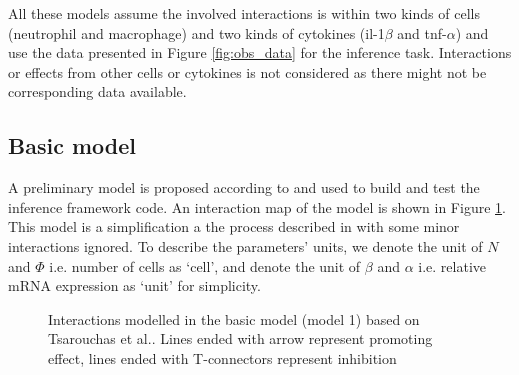 \documentclass[12pt,a4paper]{report}
\begin{document}
All these models assume the involved interactions is within two kinds of cells (neutrophil and macrophage) and two kinds of cytokines (il-1$\beta$ and tnf-$\alpha$) and use the data presented in Figure \ref{fig:obs_data} for the inference task. Interactions or effects from other cells or cytokines is not considered as there might not be corresponding data available.

\subsection{Basic model}

A preliminary model is proposed according to \cite{ref:Tsarouchas} and used to build and test the inference framework code. An interaction map of the model is shown in Figure \ref{fig:m1}. This model is a simplification a the process described in \cite{ref:Tsarouchas} with some minor interactions ignored. To describe the parameters' units, we denote the unit of $N$ and $\Phi$ i.e. number of cells as `cell', and denote the unit of $\beta$ and $\alpha$ i.e. relative mRNA expression as `unit' for simplicity.

\begin{figure}
    \begin{center}
    \end{center}
    
    \caption[Interactions modelled in the basic model]%
    {Interactions modelled in the basic model (model 1) based on Tsarouchas et al.\cite{ref:Tsarouchas}. Lines ended with arrow represent promoting effect, lines ended with T-connectors represent inhibition} 
    \label{fig:m1}
    
\end{figure}
\end{document}

